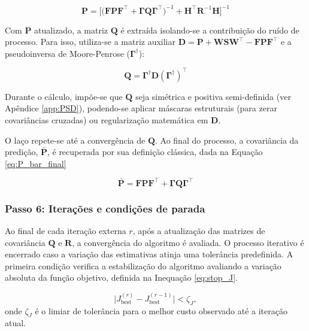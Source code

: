 \documentclass[journal]{IEEEtran}
\begin{document}
\begin{equation}
    \label{eq:P_fixedpoint}
    \mathbf{P} = \Big[ \big(\mathbf{F}\mathbf{P}\mathbf{F}^\top + \mathbf{\Gamma}\mathbf{Q}\mathbf{\Gamma}^\top\big)^{-1} + \mathbf{H}^\top\mathbf{R}^{-1}\mathbf{H} \Big]^{-1}
\end{equation}

Com $\mathbf{P}$ atualizado, a matriz $\mathbf{Q}$ é extraída isolando-se a contribuição do ruído de processo. Para isso, utiliza-se a matriz auxiliar $\mathbf{D} = \mathbf{P} + \mathbf{W}\mathbf{S}\mathbf{W}^\top - \mathbf{F}\mathbf{P}\mathbf{F}^\top$ e a pseudoinversa de Moore-Penrose ($\mathbf{\Gamma}^\dagger$):

\begin{equation}
    \label{eq:Q_update}
    \mathbf{Q} = \mathbf{\Gamma}^\dagger \mathbf{D} (\mathbf{\Gamma}^\dagger)^\top
\end{equation}

Durante o cálculo, impõe-se que $\mathbf{Q}$ seja simétrica e positiva semi-definida  (ver Apêndice \ref{app:PSD}), podendo-se aplicar máscaras estruturais (para zerar covariâncias cruzadas) ou regularização matemática em $\mathbf{D}$. 

O laço repete-se até a convergência de $\mathbf{Q}$. Ao final do processo, a covariância da predição, $\bar{\mathbf{P}}$, é recuperada por sua definição clássica, dada na Equação \eqref{eq:P_bar_final}

\begin{equation}
    \label{eq:P_bar_final}
    \bar{\mathbf{P}} = \mathbf{F}\mathbf{P}\mathbf{F}^\top + \mathbf{\Gamma}\mathbf{Q}\mathbf{\Gamma}^\top
\end{equation}

\subsubsection{\textbf{Passo 6: Iterações e condições de parada}}

Ao final de cada iteração externa $r$, após a atualização das matrizes de covariância $\mathbf{Q}$ e $\mathbf{R}$, a convergência do algoritmo é avaliada. O processo iterativo é encerrado caso a variação das estimativas atinja uma tolerância predefinida. A primeira condição verifica a estabilização do algoritmo avaliando a variação absoluta da função objetivo, definida na Inequação \eqref{eq:stop_J}.

\begin{equation}
    \label{eq:stop_J}
    \lvert J_{\text{best}}^{(r)} - J_{\text{best}}^{(r-1)} \rvert < \zeta_J,
\end{equation}
onde $\zeta_J$ é o limiar de tolerância para o melhor custo observado até a iteração atual.
\end{document}
